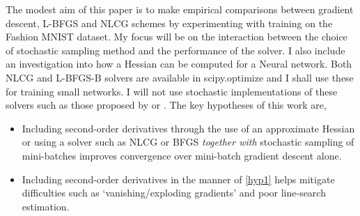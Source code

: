 \documentclass[11pt,twocolumn]{article}
\begin{document}
The modest aim of this paper is to make empirical comparisons between gradient descent, L-BFGS and NLCG schemes by experimenting with training on the Fashion MNIST dataset. My focus will be on the interaction between the choice of stochastic sampling method and the performance of the solver. I also include an investigation into how a Hessian can be computed for a  Neural network. Both NLCG and L-BFGS-B solvers are available in scipy.optimize \citep[see][SciPy v1.7.1]{scipy:min} and I shall use these for training small networks. I will not use stochastic implementations of these solvers such as those proposed by \citet{Zhao:SLBFGS} or \citet{Hong:SCGM}. The key hypotheses of this work are, 
\begin{itemize}
\item
Including second-order derivatives through the use of an approximate Hessian or using a solver such as NLCG or BFGS \textit{together with} stochastic sampling of mini-batches improves convergence over mini-batch gradient descent alone.\label{hyp1}
\item
Including second-order derivatives in the manner of \ref{hyp1} helps mitigate difficulties such as `vanishing/exploding gradients' and poor line-search estimation.
\end{itemize}
\end{document}
